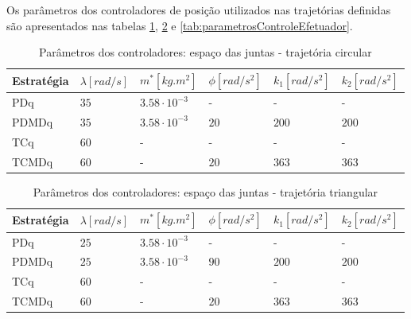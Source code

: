 \documentclass[]{politex}
\begin{document}
Os parâmetros dos controladores de posição utilizados nas trajetórias definidas são apresentados nas tabelas \ref{tab:parametrosControleAtuadoresCirculo}, \ref{tab:parametrosControleAtuadoresTriangulo} e \ref{tab:parametrosControleEfetuador}.
\begin{table}[H] 
\centering
\caption{Parâmetros dos controladores: espaço das juntas - trajetória circular}
\label{tab:parametrosControleAtuadoresCirculo}
\begin{tabular}{l|l|l|l|l|l}
Estratégia & $\lambda [rad/s]$  & $m^*[kg.m^2]$ & $\phi[rad/s^2]$   & $k_1[rad/s^2]$ & $k_2[rad/s^2]$ \\ \hline
PDq        & $35$               & $3.58 \cdot 10^{-3}$  & -         & -              & -              \\
PDMDq      & $35$               & $3.58 \cdot 10^{-3}$  & $20$      & $200$          & $200$          \\
TCq        & $60$               & -                     & -         & -              & -              \\
TCMDq      & $60$               & -                     & $20$      & $363$          & $363$          \\
\end{tabular}
\end{table}
\begin{table}[H] 
\centering
\caption{Parâmetros dos controladores: espaço das juntas - trajetória triangular}
\label{tab:parametrosControleAtuadoresTriangulo}
\begin{tabular}{l|l|l|l|l|l}
Estratégia & $\lambda [rad/s]$  & $m^*[kg.m^2]$         & $\phi[rad/s^2]$   & $k_1[rad/s^2]$ & $k_2[rad/s^2]$ \\ \hline
PDq        & $25$               & $3.58 \cdot 10^{-3}$  & -         & -              & -              \\
PDMDq      & $25$               & $3.58 \cdot 10^{-3}$  & $90$      & $200$          & $200$          \\
TCq        & $60$               & -                     & -         & -              & -              \\
TCMDq      & $60$               & -                     & $20$      & $363$          & $363$          \\
\end{tabular}
\end{table}
\end{document}
